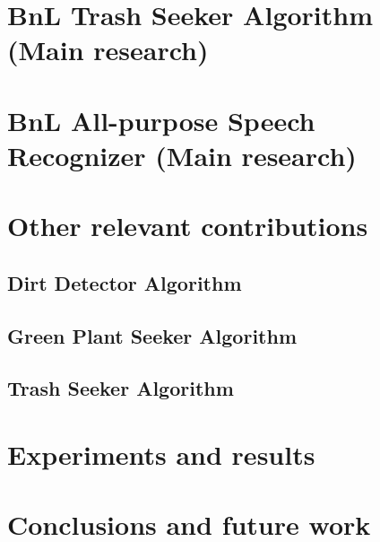 \documentclass[runningheads,a4paper]{llncs}
\begin{document}
\section{BnL Trash Seeker Algorithm (Main research)}
\lipsum[4-10]

\section{BnL All-purpose Speech Recognizer (Main research)}
\lipsum[11-13]

\section{Other relevant contributions}
\lipsum[14]
\subsection{Dirt Detector Algorithm}
\lipsum[15-17]
\subsection{Green Plant Seeker Algorithm}
\lipsum[18-20]
\subsection{Trash Seeker Algorithm}
\lipsum[20-22]

\section{Experiments and results}
\lipsum[23-24]

\section{Conclusions and future work}
\lipsum[25-26]


%
%



%

\nocite{*}

%
%

\newpage


\end{document}
